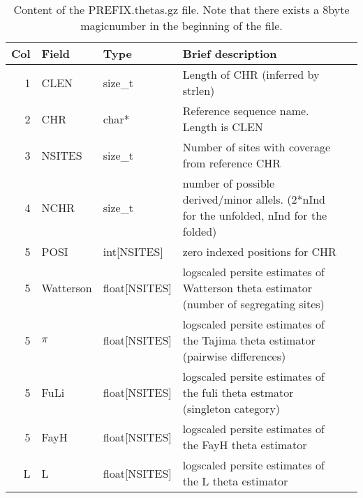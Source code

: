 \documentclass[10pt]{article}
\begin{document}
\begin{table}[h]
\begin{tabular}{rllll}
  \hline
  {\bf Col} & {\bf Field} & {\bf Type} & {\bf Brief description} \\
  \hline
  1 & {\sf CLEN} & size\_t &  Length of CHR (inferred by strlen)\\
  2 & {\sf CHR} & char* & Reference sequence name. Length is CLEN\\
  3 & {\sf NSITES} & size\_t & Number of sites with coverage from reference CHR\\
  4 & {\sf NCHR} & size\_t & number of possible derived/minor allels. (2*nInd for the unfolded, nInd for the folded)\\
  5 & {\sf POSI} & int[NSITES] & zero indexed positions for CHR \\
  5 & {\sf Watterson} & float[NSITES] & logscaled persite estimates of Watterson theta estimator (number of segregating sites) \\
  5 & {\sf $\pi$} & float[NSITES] & logscaled persite estimates of the Tajima theta estimator (pairwise differences) \\
  5 & {\sf FuLi} & float[NSITES] & logscaled persite estimates of the fuli theta estmator (singleton category) \\
  5 & {\sf FayH} & float[NSITES] & logscaled persite estimates of the FayH theta estimator\\
  L & {\sf L} & float[NSITES] & logscaled persite estimates of the L theta estimator  \\
  \hline
\end{tabular}\label{thetagz}
\caption{Content of the PREFIX.thetas.gz file. Note that there exists a 8byte magicnumber in the beginning of the file.}
\end{table}
\end{document}
